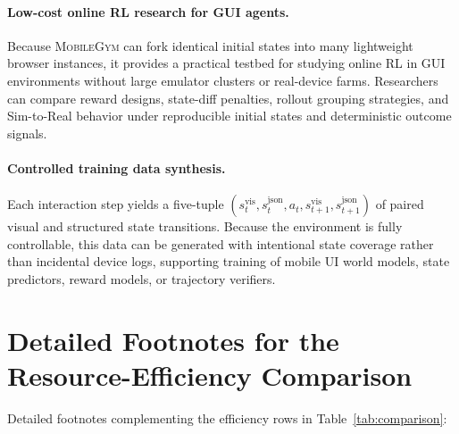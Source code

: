 \documentclass{llmxive}
\providecommand{\sys}{\textsc{MobileGym}}
\begin{document}
\paragraph{Low-cost online RL research for GUI agents.} Because \sys{} can fork identical initial states into many lightweight browser instances, it provides a practical testbed for studying online RL in GUI environments without large emulator clusters or real-device farms. Researchers can compare reward designs, state-diff penalties, rollout grouping strategies, and Sim-to-Real behavior under reproducible initial states and deterministic outcome signals.

\paragraph{Controlled training data synthesis.} Each interaction step yields a five-tuple $(s_t^\mathrm{vis}, s_t^\mathrm{json}, a_t, s_{t+1}^\mathrm{vis}, s_{t+1}^\mathrm{json})$ of paired visual and structured state transitions. Because the environment is fully controllable, this data can be generated with intentional state coverage rather than incidental device logs, supporting training of mobile UI world models, state predictors, reward models, or trajectory verifiers.


\section{Detailed Footnotes for the Resource-Efficiency Comparison}\label{app:perf}

Detailed footnotes complementing the efficiency rows in Table~\ref{tab:comparison}:
\end{document}
